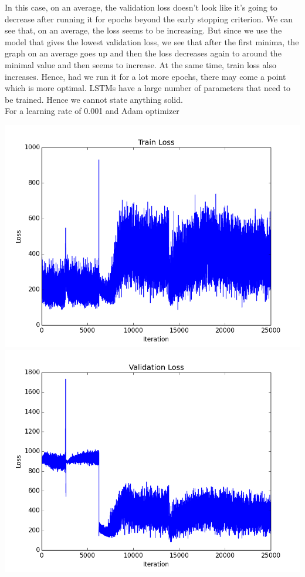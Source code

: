 \documentclass[12pt]{report}
\begin{document}
In this case, on an average, the validation loss doesn't look like it's going to decrease after running it for epochs beyond the early stopping criterion. We can see that, on an average, the loss seems to be increasing. But since we use the model that gives the lowest validation loss, we see that after the first minima, the graph on an average goes up and then the loss decreases again to around the minimal value and then seems to increase. At the same time, train loss also increases. Hence, had we run it for a lot more epochs, there may come a point which is more optimal. LSTMs have a large number of parameters that need to be trained. Hence we cannot state anything solid.\\

For a learning rate of 0.001 and Adam optimizer
\begin{center}
\includegraphics[scale=0.5]{train_loss2.png} \\
\vspace{3mm}
\includegraphics[scale=0.5]{valid_loss2.png} 
\end{center}
\end{document}

